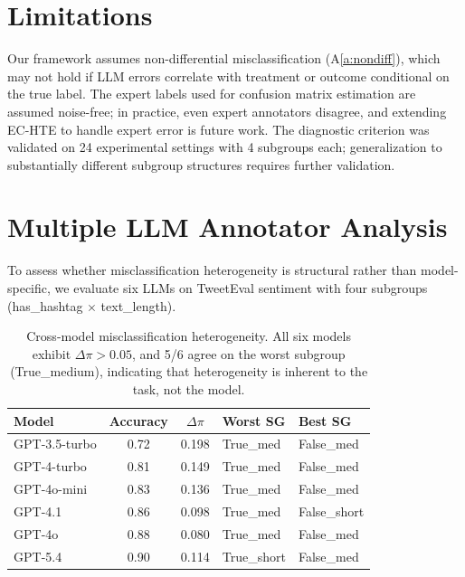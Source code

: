 \documentclass[11pt]{article}
\newcommand{\dpi}{\Delta\pi}
\begin{document}
\section*{Limitations}

Our framework assumes non-differential misclassification (A\ref{a:nondiff}), which may not hold if LLM errors correlate with treatment or outcome conditional on the true label. The expert labels used for confusion matrix estimation are assumed noise-free; in practice, even expert annotators disagree, and extending EC-HTE to handle expert error is future work. The diagnostic criterion was validated on 24 experimental settings with 4 subgroups each; generalization to substantially different subgroup structures requires further validation.



\appendix

\section{Multiple LLM Annotator Analysis}
\label{app:multi_llm}

To assess whether misclassification heterogeneity is structural rather than model-specific, we evaluate six LLMs on TweetEval sentiment with four subgroups (has\_hashtag $\times$ text\_length).

\begin{table}[h]
\centering
\small
\begin{tabular}{lccll}
\toprule
Model & Accuracy & $\dpi$ & Worst SG & Best SG \\
\midrule
GPT-3.5-turbo & 0.72 & 0.198 & True\_med & False\_med \\
GPT-4-turbo & 0.81 & 0.149 & True\_med & False\_med \\
GPT-4o-mini & 0.83 & 0.136 & True\_med & False\_med \\
GPT-4.1 & 0.86 & 0.098 & True\_med & False\_short \\
GPT-4o & 0.88 & 0.080 & True\_med & False\_med \\
GPT-5.4 & 0.90 & 0.114 & True\_short & False\_med \\
\bottomrule
\end{tabular}
\caption{Cross-model misclassification heterogeneity. All six models exhibit $\dpi > 0.05$, and 5/6 agree on the worst subgroup (True\_medium), indicating that heterogeneity is inherent to the task, not the model.}
\label{tab:multi_llm}
\end{table}
\end{document}
